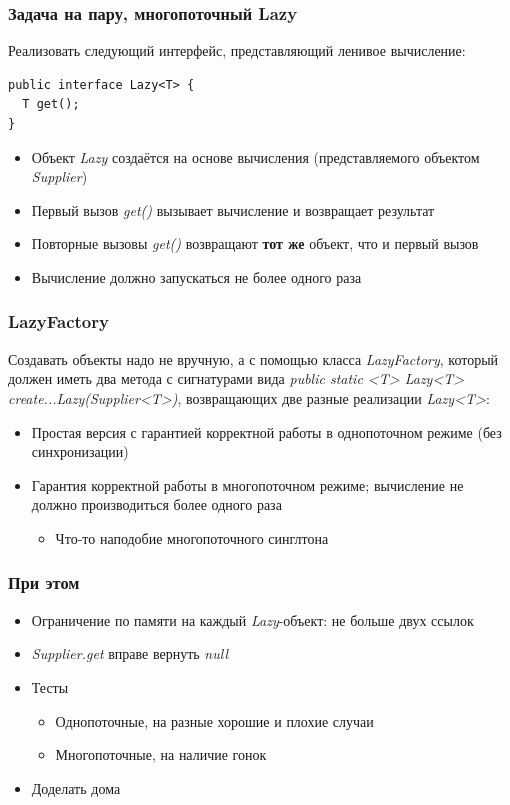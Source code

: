 \documentclass[xetex,mathserif,serif]{beamer}
\begin{document}
	\begin{frame}[fragile]
		\frametitle{Задача на пару, многопоточный Lazy}
		Реализовать следующий интерфейс, представляющий ленивое вычисление:
		
		\begin{verbatim}
public interface Lazy<T> {
  T get();
}
		\end{verbatim}

		\begin{itemize}
			\item Объект \textit{Lazy} создаётся на основе вычисления (представляемого объектом \textit{Supplier})
			\item Первый вызов \textit{get()} вызывает вычисление и возвращает результат
			\item Повторные вызовы \textit{get()} возвращают \textbf{тот же} объект, что и первый вызов
			\item Вычисление должно запускаться не более одного раза
		\end{itemize}
	\end{frame}

	\begin{frame}
		\frametitle{LazyFactory}
		Создавать объекты надо не вручную, а с помощью класса \textit{LazyFactory}, который должен
		иметь два метода с сигнатурами вида \textit{public static <T> Lazy<T> 
		create...Lazy(Supplier<T>)}, возвращающих две разные реализации \textit{Lazy<T>}:
		\begin{itemize}
			\item Простая версия с гарантией корректной работы в однопоточном режиме 
				(без синхронизации)
			\item Гарантия корректной работы в многопоточном режиме; вычисление не должно
				производиться более одного раза
			\begin{itemize}
				\item Что-то наподобие многопоточного синглтона
			\end{itemize}
		\end{itemize}
	\end{frame}
	
	\begin{frame}
		\frametitle{При этом}
		\begin{itemize}
			\item Ограничение по памяти на каждый \textit{Lazy}-объект: не больше двух ссылок
			\item \textit{Supplier.get} вправе вернуть \textit{null}
			\item Тесты
			\begin{itemize}
				\item Однопоточные, на разные хорошие и плохие случаи
				\item Многопоточные, на наличие гонок
			\end{itemize}
			\item Доделать дома
		\end{itemize}
	\end{frame}
\end{document}
